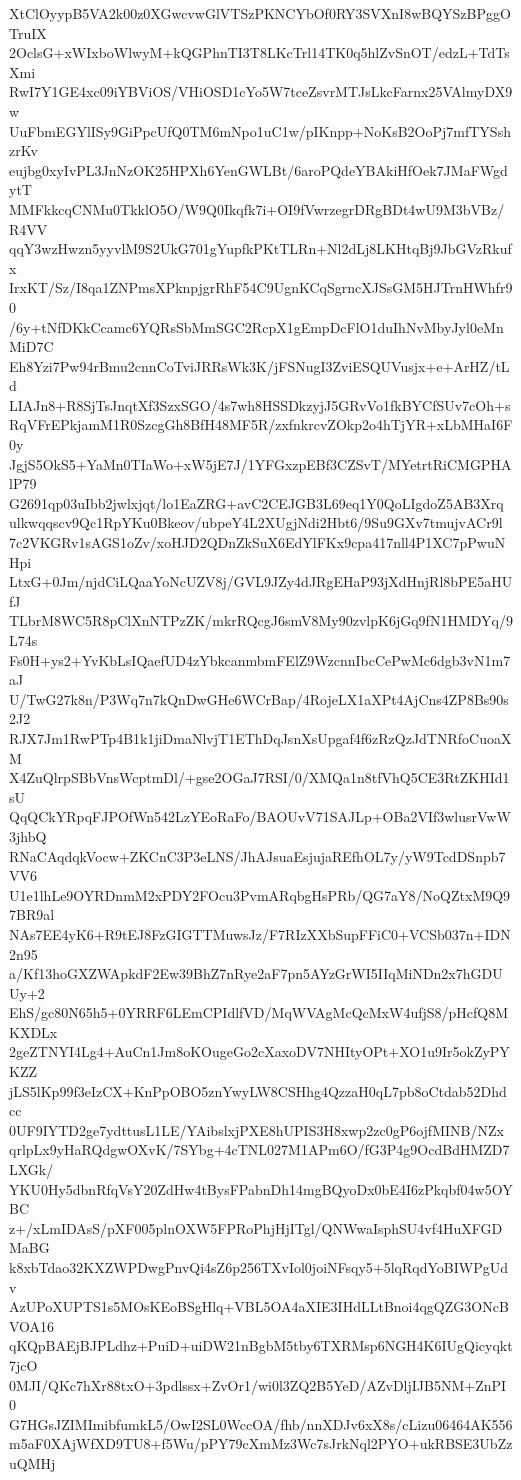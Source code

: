 XtClOyypB5VA2k00z0XGwcvwGlVTSzPKNCYbOf0RY3SVXnI8wBQYSzBPggOTruIX
2OclsG+xWIxboWlwyM+kQGPhnTI3T8LKcTrl14TK0q5hlZvSnOT/edzL+TdTsXmi
RwI7Y1GE4xc09iYBViOS/VHiOSD1cYo5W7tceZsvrMTJsLkcFarnx25VAlmyDX9w
UuFbmEGYlISy9GiPpcUfQ0TM6mNpo1uC1w/pIKnpp+NoKsB2OoPj7mfTYSshzrKv
eujbg0xyIvPL3JnNzOK25HPXh6YenGWLBt/6aroPQdeYBAkiHfOek7JMaFWgdytT
MMFkkcqCNMu0TkklO5O/W9Q0Ikqfk7i+OI9fVwrzegrDRgBDt4wU9M3bVBz/R4VV
qqY3wzHwzn5yyvlM9S2UkG701gYupfkPKtTLRn+Nl2dLj8LKHtqBj9JbGVzRkufx
IrxKT/Sz/I8qa1ZNPmsXPknpjgrRhF54C9UgnKCqSgrncXJSsGM5HJTrnHWhfr90
/6y+tNfDKkCcamc6YQRsSbMmSGC2RcpX1gEmpDcFlO1duIhNvMbyJyl0eMnMiD7C
Eh8Yzi7Pw94rBmu2cnnCoTviJRRsWk3K/jFSNugI3ZviESQUVusjx+e+ArHZ/tLd
LIAJn8+R8SjTsJnqtXf3SzxSGO/4s7wh8HSSDkzyjJ5GRvVo1fkBYCfSUv7cOh+s
RqVFrEPkjamM1R0SzcgGh8BfH48MF5R/zxfnkrcvZOkp2o4hTjYR+xLbMHaI6F0y
JgjS5OkS5+YaMn0TIaWo+xW5jE7J/1YFGxzpEBf3CZSvT/MYetrtRiCMGPHAlP79
G2691qp03uIbb2jwlxjqt/lo1EaZRG+avC2CEJGB3L69eq1Y0QoLIgdoZ5AB3Xrq
ulkwqqscv9Qc1RpYKu0Bkeov/ubpeY4L2XUgjNdi2Hbt6/9Su9GXv7tmujvACr9l
7c2VKGRv1sAGS1oZv/xoHJD2QDnZkSuX6EdYlFKx9cpa417nll4P1XC7pPwuNHpi
LtxG+0Jm/njdCiLQaaYoNcUZV8j/GVL9JZy4dJRgEHaP93jXdHnjRl8bPE5aHUfJ
TLbrM8WC5R8pClXnNTPzZK/mkrRQcgJ6smV8My90zvlpK6jGq9fN1HMDYq/9L74s
Fs0H+ys2+YvKbLsIQaefUD4zYbkcanmbmFElZ9WzcnnIbcCePwMc6dgb3vN1m7aJ
U/TwG27k8n/P3Wq7n7kQnDwGHe6WCrBap/4RojeLX1aXPt4AjCns4ZP8Bs90s2J2
RJX7Jm1RwPTp4B1k1jiDmaNlvjT1EThDqJsnXsUpgaf4f6zRzQzJdTNRfoCuoaXM
X4ZuQlrpSBbVnsWcptmDl/+gse2OGaJ7RSI/0/XMQa1n8tfVhQ5CE3RtZKHId1sU
QqQCkYRpqFJPOfWn542LzYEoRaFo/BAOUvV71SAJLp+OBa2VIf3wlusrVwW3jhbQ
RNaCAqdqkVocw+ZKCnC3P3eLNS/JhAJsuaEsjujaREfhOL7y/yW9TcdDSnpb7VV6
U1e1lhLe9OYRDnmM2xPDY2FOcu3PvmARqbgHsPRb/QG7aY8/NoQZtxM9Q97BR9al
NAs7EE4yK6+R9tEJ8FzGIGTTMuwsJz/F7RIzXXbSupFFiC0+VCSb037n+IDN2n95
a/Kf13hoGXZWApkdF2Ew39BhZ7nRye2aF7pn5AYzGrWI5IIqMiNDn2x7hGDUUy+2
EhS/gc80N65h5+0YRRF6LEmCPIdlfVD/MqWVAgMcQcMxW4ufjS8/pHcfQ8MKXDLx
2geZTNYI4Lg4+AuCn1Jm8oKOugeGo2cXaxoDV7NHItyOPt+XO1u9Ir5okZyPYKZZ
jLS5lKp99f3eIzCX+KnPpOBO5znYwyLW8CSHhg4QzzaH0qL7pb8oCtdab52Dhdcc
0UF9IYTD2ge7ydttusL1LE/YAibslxjPXE8hUPIS3H8xwp2zc0gP6ojfMINB/NZx
qrlpLx9yHaRQdgwOXvK/7SYbg+4cTNL027M1APm6O/fG3P4g9OcdBdHMZD7LXGk/
YKU0Hy5dbnRfqVsY20ZdHw4tBysFPabnDh14mgBQyoDx0bE4I6zPkqbf04w5OYBC
z+/xLmIDAsS/pXF005plnOXW5FPRoPhjHjITgl/QNWwaIsphSU4vf4HuXFGDMaBG
k8xbTdao32KXZWPDwgPnvQi4sZ6p256TXvIol0joiNFsqy5+5lqRqdYoBIWPgUdv
AzUPoXUPTS1s5MOsKEoBSgHlq+VBL5OA4aXIE3IHdLLtBnoi4qgQZG3ONcBVOA16
qKQpBAEjBJPLdhz+PuiD+uiDW21nBgbM5tby6TXRMsp6NGH4K6IUgQicyqkt7jcO
0MJI/QKc7hXr88txO+3pdlssx+ZvOr1/wi0l3ZQ2B5YeD/AZvDljIJB5NM+ZnPI0
G7HGsJZIMImibfumkL5/OwI2SL0WccOA/fhb/nnXDJv6xX8s/cLizu06464AK556
m5aF0XAjWfXD9TU8+f5Wu/pPY79cXmMz3Wc7sJrkNql2PYO+ukRBSE3UbZzuQMHj
